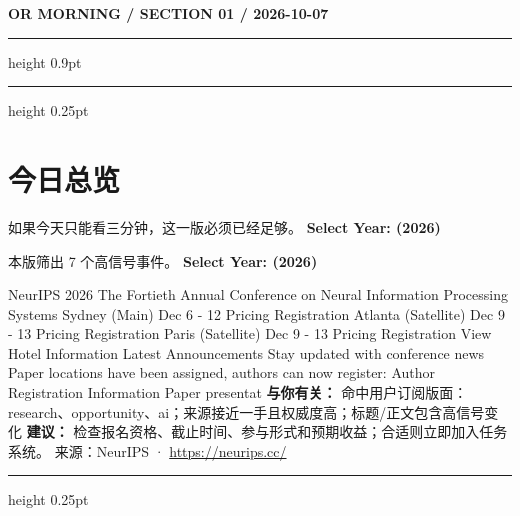 \documentclass[10.5pt]{ctexart}
\begin{document}
{\small\bfseries OR MORNING / SECTION 01 / 2026-10-07}
\vspace{2mm}
\hrule height 0.9pt
\vspace{1.5mm}
\hrule height 0.25pt
\vspace{4mm}
\section*{今日总览}
{\color{ormuted} 如果今天只能看三分钟，这一版必须已经足够。}
\vspace{2mm}
{\fontsize{25}{29}\selectfont\bfseries Select Year: (2026)}\par
\vspace{2mm}
{\large 本版筛出 7 个高信号事件。}
\vspace{3mm}
{\Large\bfseries Select Year: (2026)}\par
NeurIPS 2026 The Fortieth Annual Conference on Neural Information Processing Systems Sydney (Main) Dec 6 - 12 Pricing Registration Atlanta (Satellite) Dec 9 - 13 Pricing Registration Paris (Satellite) Dec 9 - 13 Pricing Registration View Hotel Information Latest Announcements Stay updated with conference news Paper locations have been assigned, authors can now register: Author Registration Information Paper presentat
\textbf{与你有关：} 命中用户订阅版面：research、opportunity、ai；来源接近一手且权威度高；标题/正文包含高信号变化
\textbf{建议：} 检查报名资格、截止时间、参与形式和预期收益；合适则立即加入任务系统。
{\footnotesize\color{ormuted} 来源：NeurIPS · \url{https://neurips.cc/}}
\vspace{3mm}
\hrule height 0.25pt
\vspace{3mm}
\end{document}
